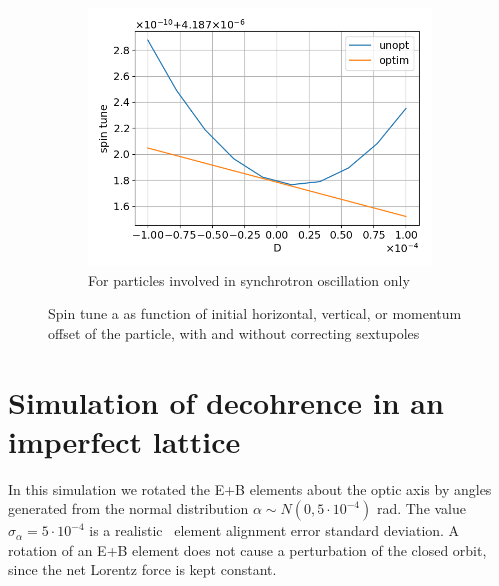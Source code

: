 \documentclass[a4paper]{jacow}
\begin{document}
\begin{figure}[h]
\begin{subfigure}{\linewidth}
    \centering
    \includegraphics[width=\linewidth]{../img/IPAC19/spin_tune_decoh_d_offset}
    \caption{For particles involved in synchrotron oscillation only\label{fig:st_decoh_synchrotron}}
  \end{subfigure}
  \caption{Spin tune a as function of initial horizontal, vertical, or momentum offset of the particle, with and without correcting sextupoles\label{fig:decoherence_suppression_sim}}
\end{figure}

\section{Simulation of decohrence in an imperfect lattice}
In this simulation we rotated the E+B elements about the optic axis by angles generated from the normal distribution $\alpha \sim N(0, 5\cdot 10^{-4})$ rad. The value $\sigma_\alpha = 5\cdot 10^{-4}$ is a realistic~\cite{Senichev:FDM} element alignment error standard deviation. A rotation of an E+B element does not cause a perturbation of the closed orbit, since the net Lorentz force is kept constant.
\end{document}
